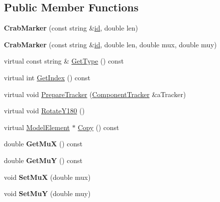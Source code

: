 \subsection*{Public Member Functions}
\begin{DoxyCompactItemize}
\item 
\mbox{\label{classCrabMarker_ae029d5f0fce67401d5274cf7b19c193c}} 
{\bfseries Crab\+Marker} (const string \&\hyperlink{classModelElement_aada171ead2085c75b592cf07d91bc5c2}{id}, double len)
\item 
\mbox{\label{classCrabMarker_a5fcb632e0f9788dec2494a3d8e67fa71}} 
{\bfseries Crab\+Marker} (const string \&\hyperlink{classModelElement_aada171ead2085c75b592cf07d91bc5c2}{id}, double len, double mux, double muy)
\item 
virtual const string \& \hyperlink{classCrabMarker_a45ab65449808d5072eb033858c2d961a}{Get\+Type} () const
\item 
virtual int \hyperlink{classCrabMarker_ae8678c41613db9792f84faf3feb88f2b}{Get\+Index} () const
\item 
virtual void \hyperlink{classCrabMarker_ab29822625603a198dc7623979ed1bb3b}{Prepare\+Tracker} (\hyperlink{classComponentTracker}{Component\+Tracker} \&a\+Tracker)
\item 
virtual void \hyperlink{classCrabMarker_a4b60620517f65b4e1f557300a3dbe89b}{Rotate\+Y180} ()
\item 
virtual \hyperlink{classModelElement}{Model\+Element} $\ast$ \hyperlink{classCrabMarker_acd6d5d5a310e985f191443b42d8abc72}{Copy} () const
\item 
\mbox{\label{classCrabMarker_a11d4fee61122e5c5ce49aefac64de104}} 
double {\bfseries Get\+MuX} () const
\item 
\mbox{\label{classCrabMarker_aeb4bdc05a12bf74a267006b6c8296ff5}} 
double {\bfseries Get\+MuY} () const
\item 
\mbox{\label{classCrabMarker_a69706d4550b59d629de7d407e8acb378}} 
void {\bfseries Set\+MuX} (double mux)
\item 
\mbox{\label{classCrabMarker_a0a6ced78b027536a8418a2c9496a0795}} 
void {\bfseries Set\+MuY} (double muy)
\end{DoxyCompactItemize}
